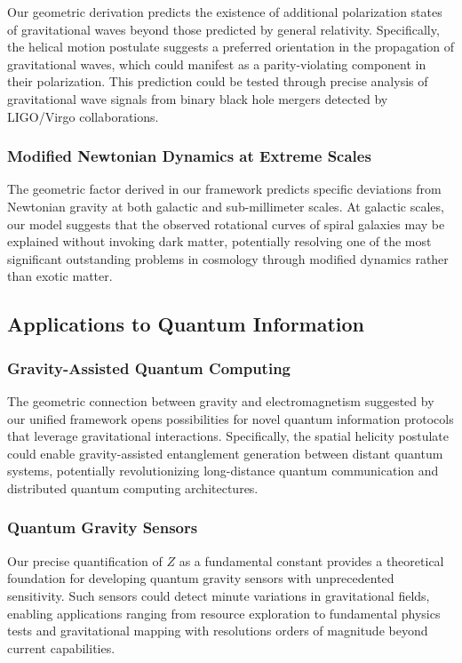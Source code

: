 \documentclass[12pt]{article}
\numberwithin{equation}{section}
\begin{document}
Our geometric derivation predicts the existence of additional polarization states of gravitational waves beyond those predicted by general relativity. Specifically, the helical motion postulate suggests a preferred orientation in the propagation of gravitational waves, which could manifest as a parity-violating component in their polarization. This prediction could be tested through precise analysis of gravitational wave signals from binary black hole mergers detected by LIGO/Virgo collaborations.

\subsubsection{Modified Newtonian Dynamics at Extreme Scales}

The geometric factor derived in our framework predicts specific deviations from Newtonian gravity at both galactic and sub-millimeter scales. At galactic scales, our model suggests that the observed rotational curves of spiral galaxies may be explained without invoking dark matter, potentially resolving one of the most significant outstanding problems in cosmology through modified dynamics rather than exotic matter.

\subsection{Applications to Quantum Information}

\subsubsection{Gravity-Assisted Quantum Computing}

The geometric connection between gravity and electromagnetism suggested by our unified framework opens possibilities for novel quantum information protocols that leverage gravitational interactions. Specifically, the spatial helicity postulate could enable gravity-assisted entanglement generation between distant quantum systems, potentially revolutionizing long-distance quantum communication and distributed quantum computing architectures.

\subsubsection{Quantum Gravity Sensors}

Our precise quantification of $Z$ as a fundamental constant provides a theoretical foundation for developing quantum gravity sensors with unprecedented sensitivity. Such sensors could detect minute variations in gravitational fields, enabling applications ranging from resource exploration to fundamental physics tests and gravitational mapping with resolutions orders of magnitude beyond current capabilities.
\end{document}
